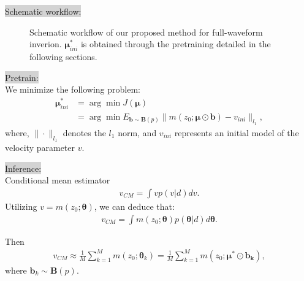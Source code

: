 \documentclass[mathserif,envcountsect,compress,8pt]{beamer}
\begin{document}
\begin{frame}
	\setlength{\parskip}{0.6\baselineskip}
	\colorbox {lightgray}{{\color{blue}Schematic workflow:}}\\
	
	\begin{figure}[H]
		\centering
		\centering
		\caption{Schematic workflow of our proposed method for full-waveform inverion. $\bm{\mu}_{ini}^{*}$ is obtained through the pretraining detailed in the following sections.}\label{fig_digram}
	\end{figure}
\end{frame}

\begin{frame}
	\setlength{\parskip}{0.6\baselineskip}
	\colorbox {lightgray}{{\color{blue}Pretrain:}}\\
	
	\vspace{10pt}
	We minimize the following problem:
	{\color{blue}
	\begin{align*}
		\bm{\mu}_{ini}^{*} & = \arg\min J(\bm{\mu})                                                           \\
		                   & = \arg\min E_{\bm{b}\sim\bm{B}(p)}\|m(z_0;\bm{\mu}\odot\bm{b})-v_{ini}\|_{l_1},
	\end{align*}}
	where, $\|\cdot\|_{l_1}$ denotes the $l_1$ norm, and $v_{ini}$ represents an initial model of the velocity parameter $v$.
\end{frame}

\begin{frame}
	\setlength{\parskip}{0.6\baselineskip}
	\colorbox {lightgray}{{\color{blue}Inference:}}\\
	\vspace{10pt}
	Conditional mean estimator
	\begin{align*}
		v_{CM} = \int vp(v|d)dv.
	\end{align*}
	Utilizing $v=m(z_0;\bm{\theta})$, we can deduce that:
	\begin{align*}
		v_{CM} = \int m(z_0;\bm{\theta})p(\bm{\theta}|d)d\bm{\theta}.
	\end{align*}
	
	Then
		{\color{blue}
			\begin{align*}
				v_{CM} \approx \frac{1}{M}\sum_{k=1}^{M}m(z_0;\bm{\theta}_k) = \frac{1}{M}\sum_{k=1}^{M}m(z_0;\bm{\mu}^*\odot \bm{b_k}),
			\end{align*}}
	where $\bm{b}_k\sim \bm{B}(p)$.
\end{frame}
\end{document}
